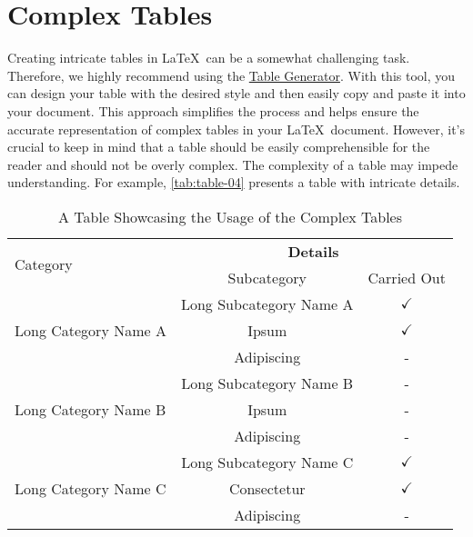 \section{Complex Tables}
Creating intricate tables in \LaTeX\ can be a somewhat challenging task. Therefore, we highly recommend using the \href{https://www.tablesgenerator.com/}{Table Generator}. With this tool, you can design your table with the desired style and then easily copy and paste it into your document. This approach simplifies the process and helps ensure the accurate representation of complex tables in your \LaTeX\ document. However, it's crucial to keep in mind that a table should be easily comprehensible for the reader and should not be overly complex. The complexity of a table may impede understanding. For example, \autoref{tab:table-04} presents a table with intricate details.

\begin{table}[!htpb]
    \caption{A Table Showcasing the Usage of the Complex Tables}
    \label{tab:table-04}
    \centering
    \begin{tabular}{lcc}
        \toprule
        \multirow{2}{*}{Category} & \multicolumn{2}{c}{\textbf{Details}} \\
        \cmidrule(lr){2-3}
        & Subcategory & Carried Out \\
        \midrule
        \multirow{3}{*}{Long Category Name A} & Long Subcategory Name A & $\checkmark$ \\
        & Ipsum & $\checkmark$ \\
        & Adipiscing & - \\
        \midrule
        \multirow{3}{*}{Long Category Name B} & Long Subcategory Name B & - \\
        & Ipsum & - \\
        & Adipiscing & - \\
        \midrule
        \multirow{3}{*}{Long Category Name C} & Long Subcategory Name C & $\checkmark$ \\
        & Consectetur & $\checkmark$ \\
        & Adipiscing & - \\
        \bottomrule
    \end{tabular}
\end{table}